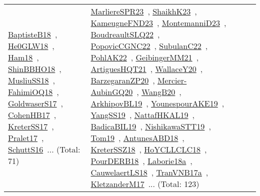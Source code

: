 {\begin{longtable}{lp{3cm}>{\raggedright\arraybackslash}p{6cm}>{\raggedright\arraybackslash}p{6cm}>{\raggedright\arraybackslash}p{8cm}}
\href{../works/BaptisteB18.pdf}{BaptisteB18}~\cite{BaptisteB18}, \href{../works/He0GLW18.pdf}{He0GLW18}~\cite{He0GLW18}, \href{../works/Ham18.pdf}{Ham18}~\cite{Ham18}, \href{../works/ShinBBHO18.pdf}{ShinBBHO18}~\cite{ShinBBHO18}, \href{../works/MusliuSS18.pdf}{MusliuSS18}~\cite{MusliuSS18}, \href{../works/FahimiOQ18.pdf}{FahimiOQ18}~\cite{FahimiOQ18}, \href{../works/GoldwaserS17.pdf}{GoldwaserS17}~\cite{GoldwaserS17}, \href{../works/CohenHB17.pdf}{CohenHB17}~\cite{CohenHB17}, \href{../works/KreterSS17.pdf}{KreterSS17}~\cite{KreterSS17}, \href{../works/Pralet17.pdf}{Pralet17}~\cite{Pralet17}, \href{../works/SchuttS16.pdf}{SchuttS16}~\cite{SchuttS16}... (Total: 71) & \href{../works/MarliereSPR23.pdf}{MarliereSPR23}~\cite{MarliereSPR23}, \href{../works/ShaikhK23.pdf}{ShaikhK23}~\cite{ShaikhK23}, \href{../works/KameugneFND23.pdf}{KameugneFND23}~\cite{KameugneFND23}, \href{../works/MontemanniD23.pdf}{MontemanniD23}~\cite{MontemanniD23}, \href{../works/BoudreaultSLQ22.pdf}{BoudreaultSLQ22}~\cite{BoudreaultSLQ22}, \href{../works/PopovicCGNC22.pdf}{PopovicCGNC22}~\cite{PopovicCGNC22}, \href{../works/SubulanC22.pdf}{SubulanC22}~\cite{SubulanC22}, \href{../works/PohlAK22.pdf}{PohlAK22}~\cite{PohlAK22}, \href{../works/GeibingerMM21.pdf}{GeibingerMM21}~\cite{GeibingerMM21}, \href{../works/ArtiguesHQT21.pdf}{ArtiguesHQT21}~\cite{ArtiguesHQT21}, \href{../works/WallaceY20.pdf}{WallaceY20}~\cite{WallaceY20}, \href{../works/BarzegaranZP20.pdf}{BarzegaranZP20}~\cite{BarzegaranZP20}, \href{../works/Mercier-AubinGQ20.pdf}{Mercier-AubinGQ20}~\cite{Mercier-AubinGQ20}, \href{../works/WangB20.pdf}{WangB20}~\cite{WangB20}, \href{../works/ArkhipovBL19.pdf}{ArkhipovBL19}~\cite{ArkhipovBL19}, \href{../works/YounespourAKE19.pdf}{YounespourAKE19}~\cite{YounespourAKE19}, \href{../works/YangSS19.pdf}{YangSS19}~\cite{YangSS19}, \href{../works/NattafHKAL19.pdf}{NattafHKAL19}~\cite{NattafHKAL19}, \href{../works/BadicaBIL19.pdf}{BadicaBIL19}~\cite{BadicaBIL19}, \href{../works/NishikawaSTT19.pdf}{NishikawaSTT19}~\cite{NishikawaSTT19}, \href{../works/Tom19.pdf}{Tom19}~\cite{Tom19}, \href{../works/AntunesABD18.pdf}{AntunesABD18}~\cite{AntunesABD18}, \href{../works/KreterSSZ18.pdf}{KreterSSZ18}~\cite{KreterSSZ18}, \href{../works/HoYCLLCLC18.pdf}{HoYCLLCLC18}~\cite{HoYCLLCLC18}, \href{../works/PourDERB18.pdf}{PourDERB18}~\cite{PourDERB18}, \href{../works/Laborie18a.pdf}{Laborie18a}~\cite{Laborie18a}, \href{../works/CauwelaertLS18.pdf}{CauwelaertLS18}~\cite{CauwelaertLS18}, \href{../works/TranVNB17a.pdf}{TranVNB17a}~\cite{TranVNB17a}, \href{../works/KletzanderM17.pdf}{KletzanderM17}~\cite{KletzanderM17}... (Total: 123)\\

\end{longtable}}
